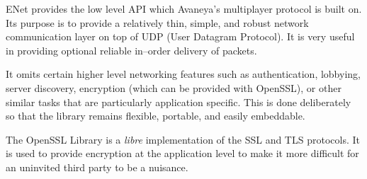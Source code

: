 

\startitemize[4]

ENet provides the low level API which Avaneya's multiplayer protocol is built on. Its purpose is to provide a relatively thin, simple, and robust network communication layer on top of UDP (User Datagram Protocol). It is very useful in providing optional reliable in--order delivery of packets. 

It omits certain higher level networking features such as authentication, lobbying, server discovery, encryption (which can be provided with OpenSSL), or other similar tasks that are particularly application specific. This is done deliberately so that the library remains flexible, portable, and easily embeddable.


The OpenSSL Library is a {\it libre} implementation of the SSL and TLS protocols. It is used to provide encryption at the application level to make it more difficult for an uninvited third party to be a nuisance.
\stopitemize


